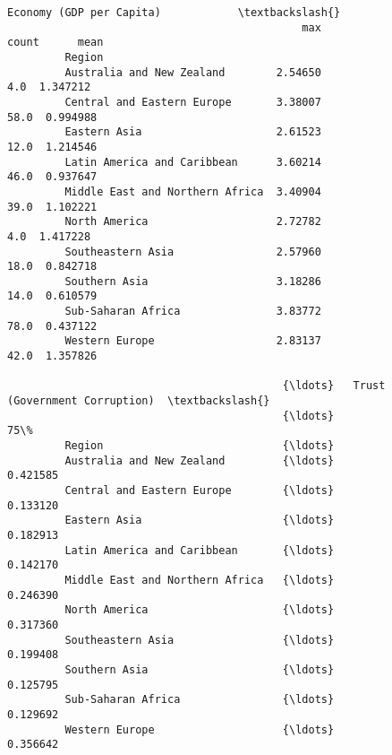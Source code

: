 \documentclass[11pt]{article}
\begin{document}
\begin{Verbatim}[commandchars=\\\{\}]
                                                  Economy (GDP per Capita)            \textbackslash{}
                                              max                    count      mean   
         Region                                                                        
         Australia and New Zealand        2.54650                      4.0  1.347212   
         Central and Eastern Europe       3.38007                     58.0  0.994988   
         Eastern Asia                     2.61523                     12.0  1.214546   
         Latin America and Caribbean      3.60214                     46.0  0.937647   
         Middle East and Northern Africa  3.40904                     39.0  1.102221   
         North America                    2.72782                      4.0  1.417228   
         Southeastern Asia                2.57960                     18.0  0.842718   
         Southern Asia                    3.18286                     14.0  0.610579   
         Sub-Saharan Africa               3.83772                     78.0  0.437122   
         Western Europe                   2.83137                     42.0  1.357826   
         
                                           {\ldots}   Trust (Government Corruption)  \textbackslash{}
                                           {\ldots}                             75\%   
         Region                            {\ldots}                                   
         Australia and New Zealand         {\ldots}                        0.421585   
         Central and Eastern Europe        {\ldots}                        0.133120   
         Eastern Asia                      {\ldots}                        0.182913   
         Latin America and Caribbean       {\ldots}                        0.142170   
         Middle East and Northern Africa   {\ldots}                        0.246390   
         North America                     {\ldots}                        0.317360   
         Southeastern Asia                 {\ldots}                        0.199408   
         Southern Asia                     {\ldots}                        0.125795   
         Sub-Saharan Africa                {\ldots}                        0.129692   
         Western Europe                    {\ldots}                        0.356642   
         

\end{Verbatim}
\end{document}
